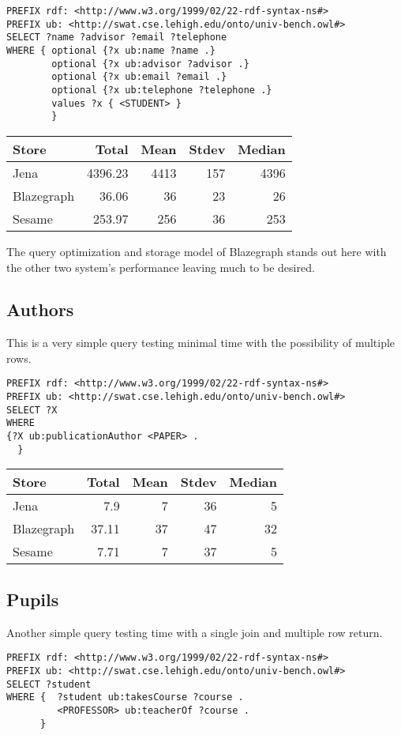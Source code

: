 \documentclass{llncs}
\begin{document}
\begin{lstlisting}
PREFIX rdf: <http://www.w3.org/1999/02/22-rdf-syntax-ns#>
PREFIX ub: <http://swat.cse.lehigh.edu/onto/univ-bench.owl#>
SELECT ?name ?advisor ?email ?telephone
WHERE { optional {?x ub:name ?name .}
        optional {?x ub:advisor ?advisor .}
        optional {?x ub:email ?email .}
        optional {?x ub:telephone ?telephone .}
        values ?x { <STUDENT> }
        }
\end{lstlisting}

\begin{tabular}{l | r r r r } Store & Total & Mean & Stdev & Median \\ \hline Jena & 4396.23 & 4413 & 157 & 4396 \\ Blazegraph & 36.06 & 36 & 23 & 26 \\ Sesame & 253.97 & 256 & 36 & 253 \end{tabular}

The query optimization and storage model of Blazegraph stands out here with the other two system's performance leaving much to be desired.

\subsection{Authors}

This is a very simple query testing minimal time with the possibility of multiple rows.

\begin{lstlisting}
PREFIX rdf: <http://www.w3.org/1999/02/22-rdf-syntax-ns#>
PREFIX ub: <http://swat.cse.lehigh.edu/onto/univ-bench.owl#>
SELECT ?X
WHERE
{?X ub:publicationAuthor <PAPER> .
  }
\end{lstlisting}

\begin{tabular}{l | r r r r } Store & Total & Mean & Stdev & Median \\ \hline Jena & 7.9 & 7 & 36 & 5 \\ Blazegraph & 37.11 & 37 & 47 & 32 \\ Sesame & 7.71 & 7 & 37 & 5 \end{tabular}

\subsection{Pupils}

Another simple query testing time with a single join and multiple row return.

\begin{lstlisting}
PREFIX rdf: <http://www.w3.org/1999/02/22-rdf-syntax-ns#>
PREFIX ub: <http://swat.cse.lehigh.edu/onto/univ-bench.owl#>
SELECT ?student
WHERE {  ?student ub:takesCourse ?course .
         <PROFESSOR> ub:teacherOf ?course .
      }
\end{lstlisting}
\end{document}
